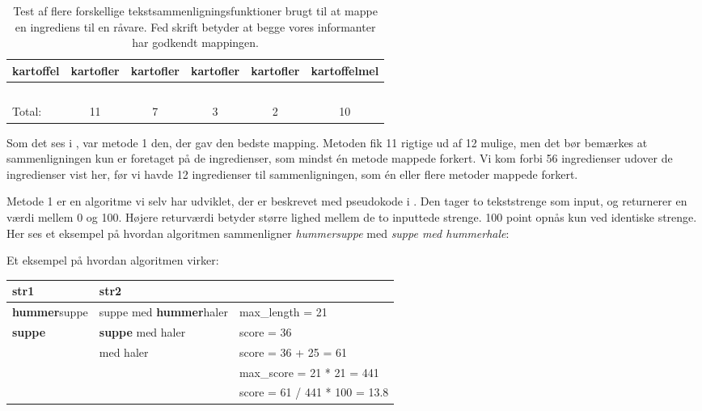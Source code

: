\begin{table}
\begin{tabular}{|p{2cm}|c|c|c|c|c|}
        kartoffel                                                  & kartofler       & kartofler               & kartofler          & kartofler          & kartoffelmel    \\ \hline
        ~                                                          & ~               & ~                       & ~                  & ~                  & ~               \\ \hline
        Total:                                                     & 11              & 7                       & 3                  & 2                  & 10              \\
        \hline
    \end{tabular}
  \caption{Test af flere forskellige tekstsammenligningsfunktioner brugt til at mappe en ingrediens til en råvare. Fed skrift betyder at begge vores informanter har godkendt mappingen.}  \label{table:test-af-compares}
\end{table}

Som det ses i , var metode 1 den, der gav den bedste mapping. Metoden fik 11 rigtige ud af 12 mulige, men det bør bemærkes at sammenligningen kun er foretaget på de ingredienser, som mindst én metode mappede forkert. Vi kom forbi 56 ingredienser udover de ingredienser vist her, før vi havde 12 ingredienser til sammenligningen, som én eller flere metoder mappede forkert. 

Metode 1 er en algoritme vi selv har udviklet, der er beskrevet med pseudokode i . Den tager to tekststrenge som input, og returnerer en værdi mellem 0 og 100. Højere returværdi betyder større lighed mellem de to inputtede strenge. 100 point opnås kun ved identiske strenge.
Her ses et eksempel på hvordan algoritmen sammenligner \textit{hummersuppe} med \textit{suppe med hummerhale}:


\begin{algorithm} [H]
	\label{alg:parsing}
	
\end{algorithm}

Et eksempel på hvordan algoritmen virker:
\begin{table}
    \begin{tabular}{|l|l|l|}
        \hline
        str1        & str2                  & ~                             \\ \hline
        \textbf{hummer}suppe & suppe med \textbf{hummer}haler & max_length = 21               \\ 
        \textbf{suppe}       & \textbf{suppe} med haler       & score = 36                    \\ 
        ~           &  med haler            & score = 36 + 25 = 61          \\ 
        ~           & ~                     & max_score = 21 * 21  = 441    \\ 
        ~           & ~                     & score = 61 / 441 * 100 = 13.8 \\
        \hline
    \end{tabular}
\end{table}